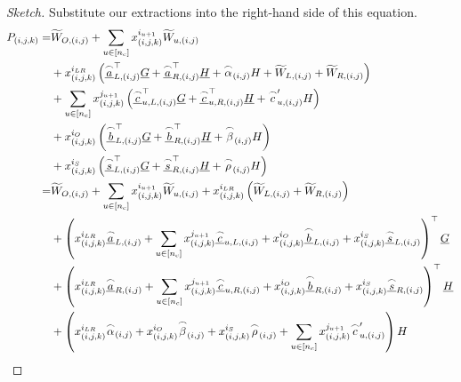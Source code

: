 \documentclass{article}
\theoremstyle{definition}
\begin{document}
\begin{proof}[Sketch]
Substitute our extractions into the right-hand side of this equation.
\begin{align}
P_{(i,j,k)} =& \widetilde{W}_{O, (i,j)} + \sum_{u \in [n_c]} x_{(i,j,k)}^{i_{u+1}} \widetilde{W}_{u, (i,j)} \label{eqn:tomato}\\
&  + x_{(i,j,k)}^{i_{LR}}\left(\underline{\overset{\LARGE \frown}{\small{a}}}_{L, (i,j)}^\top \underline{G} + \underline{\overset{\LARGE \frown}{\small{a}}}_{R, (i,j)}^\top \underline{H} + \overset{\LARGE \frown}{\small{\alpha}}_{(i,j)} H + \widetilde{W}_{L,(i,j)} + \widetilde{W}_{R,(i,j)}\right) \notag\\
& + \sum_{u \in [n_c]} x_{(i,j,k)}^{j_{u+1}} \left(\underline{\overset{\LARGE \frown}{\small{c}}}_{u,L, (i,j)}^\top \underline{G} + \underline{\overset{\LARGE \frown}{\small{c}}}_{u,R, (i,j)}^\top \underline{H} + \overset{\LARGE \frown}{\small{c}}_{u, (i,j)}^\prime H\right) \notag\\
& + x_{(i,j,k)}^{i_O} \left(\underline{\overset{\LARGE \frown}{\small{b}}}_{L, (i,j)}^\top \underline{G} + \underline{\overset{\LARGE \frown}{\small{b}}}_{R, (i,j)}^\top \underline{H} + \overset{\LARGE \frown}{\small{\beta}}_{(i,j)} H\right) \notag\\
& + x_{(i,j,k)}^{i_S}\left(\underline{\overset{\LARGE \frown}{\small{s}}}_{L, (i,j)}^\top \underline{G} + \underline{\overset{\LARGE \frown}{\small{s}}}_{R, (i,j)}^\top \underline{H} + \overset{\LARGE \frown}{\small{\rho}}_{(i,j)} H\right)  \notag\\
=& \widetilde{W}_{O, (i,j)} + \sum_{u \in [n_c]} x_{(i,j,k)}^{i_{u+1}} \widetilde{W}_{u, (i,j)} + x^{i_{LR}}_{(i,j,k)} \left(\widetilde{W}_{L,(i,j)} + \widetilde{W}_{R,(i,j)}\right) \notag\\
&+ \left(x^{i_{LR}}_{(i,j,k)}\underline{\overset{\LARGE \frown}{\small{a}}}_{L, (i,j)} + \sum_{u \in [n_c]} x^{j_{u+1}}_{(i,j,k)} \underline{\overset{\LARGE \frown}{\small{c}}}_{u,L, (i,j)} + x^{i_O}_{(i,j,k)}\underline{\overset{\LARGE \frown}{\small{b}}}_{L, (i,j)} + x^{i_S}_{(i,j,k)} \underline{\overset{\LARGE \frown}{\small{s}}}_{L, (i,j)} \right)^\top\underline{G} \notag\\
&+ \left(x^{i_{LR}}_{(i,j,k)}\underline{\overset{\LARGE \frown}{\small{a}}}_{R, (i,j)} + \sum_{u \in [n_c]} x^{j_{u+1}}_{(i,j,k)} \underline{\overset{\LARGE \frown}{\small{c}}}_{u,R, (i,j)} + x^{i_O}_{(i,j,k)}\underline{\overset{\LARGE \frown}{\small{b}}}_{R, (i,j)} + x^{i_S}_{(i,j,k)} \underline{\overset{\LARGE \frown}{\small{s}}}_{R, (i,j)} \right)^\top\underline{H}  \notag\\
& +\left(x^{i_{LR}}_{(i,j,k)}\overset{\LARGE \frown}{\small{\alpha}}_{(i,j)} + x^{i_O}_{(i,j,k)}\overset{\LARGE \frown}{\small{\beta}}_{(i,j)} + x^{i_S}_{(i,j,k)}\overset{\LARGE \frown}{\small{\rho}}_{(i,j)} + \sum_{u \in [n_c]} x_{(i,j,k)}^{j_{u+1}} \overset{\LARGE \frown}{\small{c}}^\prime_{u,(i,j)}\right)H \notag
\end{align}


\end{proof}
\end{document}
